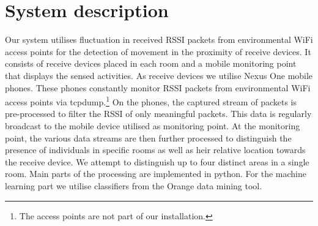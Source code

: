 \documentclass{sig-alternate-ipsn13}
\begin{document}
  \section{System description}
  Our system utilises fluctuation in received RSSI packets from environmental WiFi access points for the detection of movement in the proximity of receive devices. 
  It consists of receive devices placed in each room and a mobile monitoring point that displays the sensed activities. 
  As receive devices we utilise Nexus One mobile phones.
  These phones constantly monitor RSSI packets from environmental WiFi access points via tcpdump.\footnote{The access points are not part of our installation.}
  On the phones, the captured stream of packets is pre-processed to filter the RSSI of only meaningful packets.
  This data is regularly broadcast to the mobile device utilised as monitoring point.
  At the monitoring point, the various data streams are then further processed to distinguish the presence of individuals in specific rooms as well as heir relative location towards the receive device. 
  We attempt to distinguish up to four distinct areas in a single room.
  Main parts of the processing are implemented in python. 
  For the machine learning part we utilise classifiers from the Orange data mining tool.



%

%
%


\end{document}

